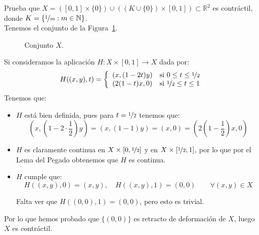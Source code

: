 \begin{ejercicio}
    Prueba que $X=([0,1]\times \{0\})\cup ((K\cup \{0\})\times [0,1])\subset \mathbb{R}^2$ es contráctil, donde $K = \left\{\nicefrac{1}{m}:m\in \mathbb{N}\right\}$.\\

    \noindent
    Tenemos el conjunto de la Figura~\ref{fig:12_rel2}.
    \begin{figure}[H]
        \centering
        \caption{Conjunto $X$.}
        \label{fig:12_rel2}
    \end{figure}
    \noindent
    Si consideramos la aplicación $H:X\times [0,1]\to X$ dada por:
    \begin{equation*}
        H((x,y),t) = \left\{\begin{array}{ll}
                (x,(1-2t)y)& \text{si\ } 0\leq t\leq \nicefrac{1}{2}\\
                (2(1-t)x,0)& \text{si\ } \nicefrac{1}{2}\leq t\leq 1
        \end{array}\right. 
    \end{equation*}
    Tenemos que:
    \begin{itemize}
        \item $H$ está bien definida, pues para $t = \nicefrac{1}{2}$ tenemos que:
            \begin{equation*}
                \left(x,\left(1-2\cdot \frac{1}{2}\right)y\right) = (x,(1-1)y) = (x,0) = \left(2\left(1-\frac{1}{2}\right)x,0\right) 
            \end{equation*}
        \item $H$ es claramente continua en $X\times [0,\nicefrac{1}{2}]$ y en $X\times [\nicefrac{1}{2},1]$, por lo que por el Lema del Pegado obtenemos que $H$ es continua.
        \item $H$ cumple que:
            \begin{equation*}
                H((x,y),0) = (x,y),\quad H((x,y),1) = (0,0)\qquad \forall (x,y)\in X
            \end{equation*}

            Falta ver que $H((0,0),1) = (0,0)$, pero esto es trivial.
    \end{itemize}
    Por lo que hemos probado que $\{(0,0)\}$ es retracto de deformación de $X$, luego $X$ es contráctil.
\end{ejercicio}

